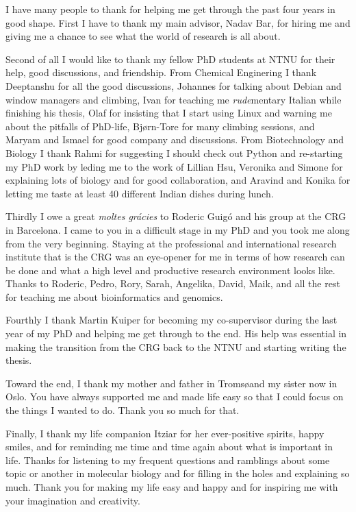I have many people to thank for helping me get through the past four years in
good shape. First I have to thank my main advisor, Nadav Bar, for hiring me and
giving me a chance to see what the world of research is all about.

Second of all I would like to thank my fellow PhD students at NTNU for their
help, good discussions, and friendship. From Chemical Enginering I thank
Deeptanshu for all the good discussions, Johannes for talking about Debian and
window managers and climbing, Ivan for teaching me \textit{rude}mentary Italian
while finishing his thesis, Olaf for insisting that I start using Linux and
warning me about the pitfalls of PhD-life, Bjørn-Tore for many climbing
sessions, and Maryam and Ismael for good company and discussions. From
Biotechnology and Biology I thank Rahmi for suggesting I should check out
Python and re-starting my PhD work by leding me to the work of Lillian Hsu,
Veronika and Simone for explaining lots of biology and for good collaboration,
and Aravind and Konika for letting me taste at least 40 different Indian dishes
during lunch.

Thirdly I owe a great \textit{moltes grácies} to Roderic Guigó and his group at
the CRG in Barcelona. I came to you in a difficult stage in my PhD and you took
me along from the very beginning. Staying at the professional and international
research institute that is the CRG was an eye-opener for me in terms of how
research can be done and what a high level and productive research environment
looks like. Thanks to Roderic, Pedro, Rory, Sarah, Angelika, David, Maik, and
all the rest for teaching me about bioinformatics and genomics.

Fourthly I thank Martin Kuiper for becoming my co-supervisor during the last
year of my PhD and helping me get through to the end. His help was essential in
making the transition from the CRG back to the NTNU and starting writing the
thesis.

Toward the end, I thank my mother and father in Troms\o and my sister now in
Oslo. You have always supported me and made life easy so that I could focus on
the things I wanted to do. Thank you so much for that.

Finally, I thank my life companion Itziar for her ever-positive spirits, happy
smiles, and for reminding me time and time again about what is important in
life. Thanks for listening to my frequent questions and ramblings about some
topic or another in molecular biology and for filling in the holes and
explaining so much. Thank you for making my life easy and happy and for
inspiring me with your imagination and creativity.
